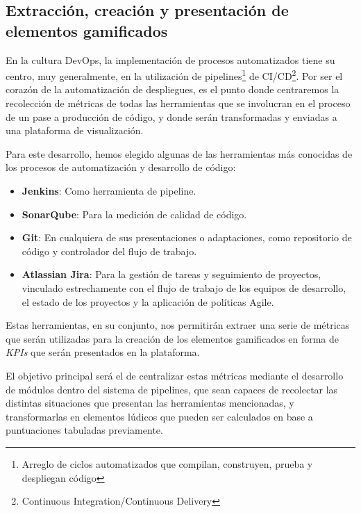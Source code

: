 \documentclass[journal]{IEEEtran}
\begin{document}
\subsection{\textbf{Extracción, creación y presentación de elementos gamificados}} \label{extraccion-creacion-presentacion}

En la cultura DevOps, la implementación de procesos automatizados tiene su centro, muy generalmente, en la utilización de pipelines\footnote{Arreglo de ciclos automatizados que compilan, construyen, prueba y despliegan código} de CI/CD\footnote{Continuous Integration/Continuous Delivery}. Por ser el corazón de la automatización de despliegues, es el punto donde centraremos la recolección de métricas de todas las herramientas que se involucran en el proceso de un pase a producción de código, y donde serán transformadas y enviadas a una plataforma de visualización.

Para este desarrollo, hemos elegido algunas de las herramientas más conocidas de los procesos de automatización y desarrollo de código: 
\begin{itemize}
    \item \textbf{Jenkins}\cite{jenkins}: Como herramienta de pipeline.
    \item \textbf{SonarQube}\cite{sonarqube}: Para la medición de calidad de código.
    \item \textbf{Git}\cite{git}: En cualquiera de sus presentaciones o adaptaciones, como repositorio de código y controlador del flujo de trabajo.
    \item \textbf{Atlassian Jira}\cite{jira}: Para la gestión de tareas y seguimiento de proyectos, vinculado estrechamente con el flujo de trabajo de los equipos de desarrollo, el estado de los proyectos y la aplicación de políticas Agile.
\end{itemize} 

Estas herramientas, en su conjunto, nos permitirán extraer una serie de métricas que serán utilizadas para la creación de los elementos gamificados en forma de \textit{KPIs} que serán presentados en la plataforma.

El objetivo principal será el de centralizar estas métricas mediante el desarrollo de módulos dentro del sistema de pipelines, que sean capaces de recolectar las distintas situaciones que presentan las herramientas mencionadas, y transformarlas en elementos lúdicos que pueden ser calculados en base a puntuaciones tabuladas previamente.
\end{document}
